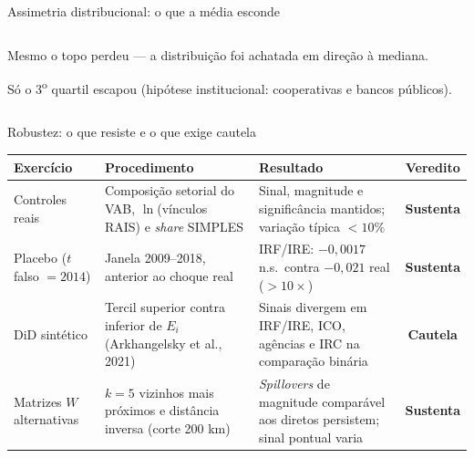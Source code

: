 \documentclass[aspectratio=169,10pt]{beamer}
\newcommand{\dest}[1]{\textcolor{cedlaranja}{\textbf{#1}}}
\newcommand{\pos}[1]{\textcolor{cedverde}{\textbf{#1}}}
\newcommand{\ex}{E_i}
\begin{document}
\begin{frame}{Assimetria distribucional: o que a média esconde}
\begin{columns}[c]
\begin{column}{0.42\textwidth}
\begin{columns}[T]
\begin{column}{0.56\textwidth}
          \smallskip
          Mesmo o topo perdeu --- a distribuição foi achatada em direção à mediana.

          \smallskip
          Só o 3\textsuperscript{o} quartil escapou (hipótese institucional:
          cooperativas e bancos públicos).
        \end{column}
      \end{columns}
    \end{column}
  \end{columns}
\end{frame}

\begin{frame}{Robustez: o que resiste e o que exige cautela}
  \centering
  \footnotesize
  \begin{tabular}{@{}P{0.17\textwidth}P{0.26\textwidth}P{0.35\textwidth}c@{}}
    \toprule
    \textbf{Exercício} & \textbf{Procedimento} & \textbf{Resultado} & \textbf{Veredito}\\
    \midrule
    Controles reais & Composição setorial do VAB, $\ln$(vínculos RAIS) e
      \emph{share} SIMPLES & Sinal, magnitude e significância mantidos; variação
      típica $<10\%$ & \pos{Sustenta}\\
    Placebo ($t$ falso $=2014$) & Janela 2009--2018, anterior ao choque real &
      IRF/IRE: $-0{,}0017$ n.s.\ contra $-0{,}021$ real ($>10\times$) &
      \pos{Sustenta}\\
    DiD sintético & Tercil superior contra inferior de $\ex$
      (Arkhangelsky et al., 2021) & Sinais divergem em IRF/IRE, ICO, agências e IRC
      na comparação binária & \dest{Cautela}\\
    Matrizes $W$ alternativas & $k=5$ vizinhos mais próximos e distância inversa
      (corte 200 km) & \emph{Spillovers} de magnitude comparável aos diretos
      persistem; sinal pontual varia & \pos{Sustenta}\\
    \bottomrule
  \end{tabular}


\end{frame}
\end{document}
